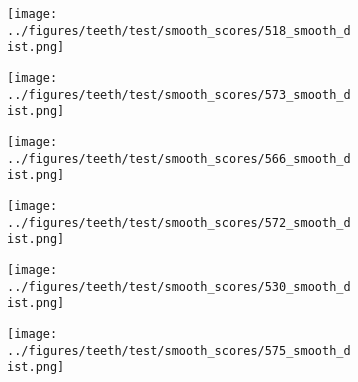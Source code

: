 \begin{figure}[h!]
\begin{subfigure}{0.16\textwidth}
			\texttt{[image: ../figures/teeth/test/smooth\_scores/518\_smooth\_dist.png]}
			\label{fig:1}
		\end{subfigure}
	\begin{subfigure}{0.16\textwidth}
			\centering
			\texttt{[image: ../figures/teeth/test/smooth\_scores/573\_smooth\_dist.png]}
			\label{fig:1}
		\end{subfigure}
	\begin{subfigure}{0.16\textwidth}
			\centering
			\texttt{[image: ../figures/teeth/test/smooth\_scores/566\_smooth\_dist.png]}
			\label{fig:1}
		\end{subfigure}
	\begin{subfigure}{0.16\textwidth}
			\centering
			\texttt{[image: ../figures/teeth/test/smooth\_scores/572\_smooth\_dist.png]}
			\label{fig:1}
		\end{subfigure}
	\begin{subfigure}{0.16\textwidth}
			\centering
			\texttt{[image: ../figures/teeth/test/smooth\_scores/530\_smooth\_dist.png]}
			\label{fig:1}
		\end{subfigure}
	\begin{subfigure}{0.16\textwidth}
			\centering
			\texttt{[image: ../figures/teeth/test/smooth\_scores/575\_smooth\_dist.png]}
			\label{fig:1}
		\end{subfigure}
	\caption{}\label{fig:teeth}
\end{figure}